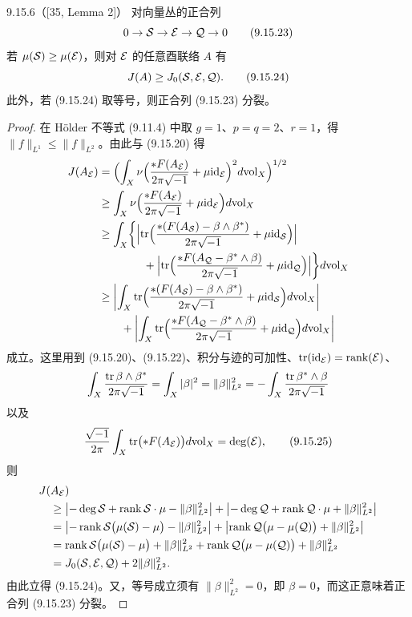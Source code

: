 \begin{lemma*}{9.15.6（[35, Lemma 2]）}
  对向量丛的正合列
  \begin{equation}
    0\to\mathcal{S}\to\mathcal{E}\to\mathcal{Q}\to0
    \tag{9.15.23}
  \end{equation}
  若 $\mu(\mathcal{S})\ge\mu(\mathcal{E})$，则对 $\mathcal{E}$ 的任意酉联络 $A$ 有
  \begin{equation}
    J(A)\ge J_0(\mathcal{S},\mathcal{E},\mathcal{Q}).
    \tag{9.15.24}
  \end{equation}
  此外，若 (9.15.24) 取等号，则正合列 (9.15.23) 分裂。
\end{lemma*}
\begin{proof}
  在 Hölder 不等式 (9.11.4) 中取 $g=1$、$p=q=2$、$r=1$，得 $\|f\|_{L^1}\le\|f\|_{L^2}$。由此与 (9.15.20) 得
  \begin{align*}
    J(A_{\mathcal{E}})&=\Bigl(\int_X\nu\Bigl(\frac{\ast F(A_{\mathcal{E}})}{2\pi\sqrt{-1}}+\mu\mathrm{id}_{\mathcal{E}}\Bigr)^2d\mathrm{vol}_X\Bigr)^{1/2}\\
    &\ge\int_X\nu\Bigl(\frac{\ast F(A_{\mathcal{E}})}{2\pi\sqrt{-1}}+\mu\mathrm{id}_{\mathcal{E}}\Bigr)d\mathrm{vol}_X\\
    &\ge\int_X\biggl\{\Bigl|\operatorname{tr}\Bigl(\frac{\ast(F(A_{\mathcal{S}})-\beta\wedge\beta^*)}{2\pi\sqrt{-1}}+\mu\mathrm{id}_{\mathcal{S}}\Bigr)\Bigr|\\
    &\qquad\qquad+\Bigl|\operatorname{tr}\Bigl(\frac{\ast F(A_{\mathcal{Q}}-\beta^*\wedge\beta)}{2\pi\sqrt{-1}}+\mu\mathrm{id}_{\mathcal{Q}}\Bigr)\Bigr|\biggr\}d\mathrm{vol}_X\\
    &\ge\biggl|\int_X\operatorname{tr}\Bigl(\frac{\ast(F(A_{\mathcal{S}})-\beta\wedge\beta^*)}{2\pi\sqrt{-1}}+\mu\mathrm{id}_{\mathcal{S}}\Bigr)d\mathrm{vol}_X\biggr|\\
    &\qquad+\biggl|\int_X\operatorname{tr}\Bigl(\frac{\ast F(A_{\mathcal{Q}}-\beta^*\wedge\beta)}{2\pi\sqrt{-1}}+\mu\mathrm{id}_{\mathcal{Q}}\Bigr)d\mathrm{vol}_X\biggr|
  \end{align*}
  成立。这里用到 (9.15.20)、(9.15.22)、积分与迹的可加性、$\operatorname{tr}(\mathrm{id}_{\mathcal{E}})=\operatorname{rank}(\mathcal{E})$、
  \begin{align*}
    \int_X\frac{\operatorname{tr}\beta\wedge\beta^*}{2\pi\sqrt{-1}}
    =\int_X|\beta|^2=\|\beta\|^2_{L^2}
    =-\int_X\frac{\operatorname{tr}\beta^*\wedge\beta}{2\pi\sqrt{-1}}
  \end{align*}
  以及
  \begin{equation}
    \frac{\sqrt{-1}}{2\pi}\int_X\operatorname{tr}\bigl(\ast F(A_{\mathcal{E}})\bigr)d\mathrm{vol}_X=\deg(\mathcal{E}),
    \tag{9.15.25}
  \end{equation}
  则
  \begin{align*}
    &J(A_{\mathcal{E}})\\
    &\quad\ge\bigl|-\deg\mathcal{S}+\operatorname{rank}\mathcal{S}\cdot\mu-\|\beta\|^2_{L^2}\bigr|
      +\bigl|-\deg\mathcal{Q}+\operatorname{rank}\mathcal{Q}\cdot\mu+\|\beta\|^2_{L^2}\bigr|\\
    &\quad=\bigl|-\operatorname{rank}\mathcal{S}\bigl(\mu(\mathcal{S})-\mu\bigr)-\|\beta\|^2_{L^2}\bigr|
      +\bigl|\operatorname{rank}\mathcal{Q}\bigl(\mu-\mu(\mathcal{Q})\bigr)+\|\beta\|^2_{L^2}\bigr|\\
    &\quad=\operatorname{rank}\mathcal{S}\bigl(\mu(\mathcal{S})-\mu\bigr)+\|\beta\|^2_{L^2}
      +\operatorname{rank}\mathcal{Q}\bigl(\mu-\mu(\mathcal{Q})\bigr)+\|\beta\|^2_{L^2}\\
    &\quad=J_0(\mathcal{S},\mathcal{E},\mathcal{Q})+2\|\beta\|^2_{L^2}.
  \end{align*}
  由此立得 (9.15.24)。又，等号成立须有 $\|\beta\|^2_{L^2}=0$，即 $\beta=0$，而这正意味着正合列 (9.15.23) 分裂。
\end{proof}


